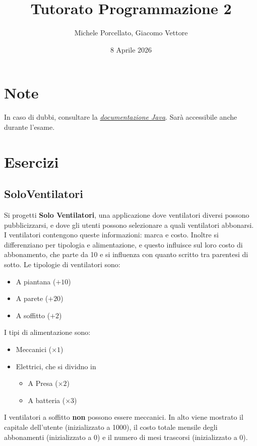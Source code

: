 \documentclass{article}
\title{Tutorato Programmazione 2}
\author{Michele Porcellato, Giacomo Vettore}
\date{8 Aprile 2026}
\begin{document}
\maketitle

\section{Note}
In caso di dubbi, consultare la \href{https://docs.oracle.com/en/java/javase/25/docs/api/index.html}{\textit{documentazione Java}}. Sarà accessibile anche durante l'esame.

\section{Esercizi}
\subsection{SoloVentilatori}
Si progetti \textbf{Solo Ventilatori}, una applicazione dove ventilatori diversi possono pubblicizzarsi, e dove gli utenti possono selezionare a quali ventilatori abbonarsi.
I ventilatori contengono queste informazioni: marca e costo. Inoltre si differenziano per tipologia e alimentazione, e questo influisce sul loro costo di abbonamento, che parte da 10 e si influenza con quanto scritto tra parentesi di sotto.
\newline
Le tipologie di ventilatori sono: 
\begin{itemize}
    \item A piantana (\(+10\))
    \item A parete (\(+20\))
    \item A soffitto (\(+2\))
\end{itemize}
I tipi di alimentazione sono: 
\begin{itemize}
    \item Meccanici (\(\times1\))
    \item Elettrici, che si dividno in 
    \begin{itemize}
        \item A Presa (\(\times2\))
        \item A batteria (\(\times3\))
    \end{itemize}
\end{itemize}
I ventilatori a soffitto \textbf{non} possono essere meccanici.
\newline
In alto viene mostrato il capitale dell'utente (inizializzato a 1000), il costo totale mensile degli abbonamenti (inizializzato a 0) e il numero di mesi trascorsi (inizializzato a 0).
\end{document}
